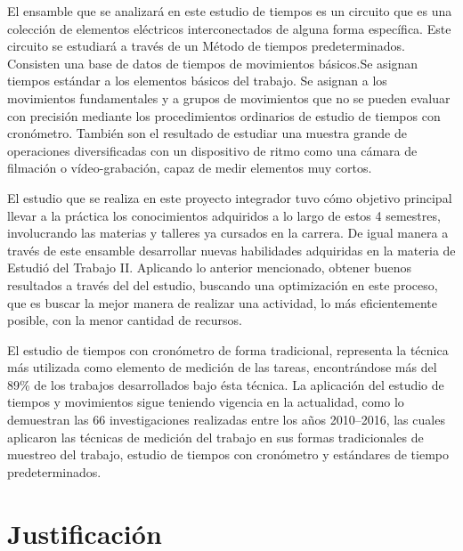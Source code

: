     El ensamble que se analizará en este estudio de tiempos es un circuito  que es una colección de elementos eléctricos interconectados de alguna forma específica. Este circuito se estudiará a través de un Método de tiempos predeterminados. Consisten una base de datos de tiempos de movimientos básicos.Se asignan tiempos estándar a los elementos básicos del trabajo. Se asignan a los movimientos fundamentales y a grupos de movimientos que no se pueden evaluar con precisión mediante los procedimientos ordinarios de estudio de tiempos con cronómetro. También son el resultado de estudiar una muestra grande de operaciones diversificadas con un dispositivo de ritmo como una cámara de filmación o vídeo-grabación, capaz de medir elementos muy cortos. \cite{parra2020analisis}
    
    El estudio que se realiza en este proyecto integrador tuvo cómo objetivo principal llevar a la práctica los conocimientos adquiridos a lo largo de estos 4 semestres, involucrando las materias y talleres ya cursados en la carrera. De igual manera a través de este ensamble desarrollar nuevas habilidades adquiridas en la materia de Estudió del Trabajo II. Aplicando lo anterior mencionado, obtener buenos resultados a través del del estudio, buscando  una optimización en este proceso, que es buscar la mejor manera de realizar una actividad, lo más eficientemente posible, con la menor cantidad de recursos.
    
    El estudio de tiempos con cronómetro de forma tradicional, representa la técnica más utilizada como elemento de medición de las tareas, encontrándose más del 89\% de los trabajos desarrollados bajo ésta técnica.
    La aplicación del estudio de tiempos y movimientos sigue teniendo vigencia en la actualidad, como lo demuestran las 66 investigaciones realizadas entre los años 2010–2016, las cuales aplicaron las técnicas de medición del trabajo en sus formas tradicionales de muestreo del trabajo, estudio de tiempos con cronómetro y estándares de tiempo predeterminados.
    
     
    \section{Justificación}
    
